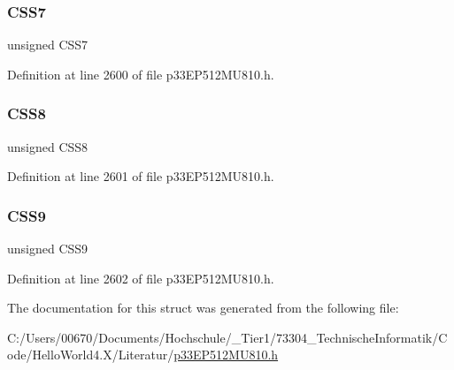 \subsubsection{\texorpdfstring{C\+S\+S7}{CSS7}}
{\footnotesize\ttfamily unsigned C\+S\+S7}



Definition at line 2600 of file p33\+E\+P512\+M\+U810.\+h.

\mbox{\label{structtag_a_d1_c_s_s_l_b_i_t_s_a867408da1e20ee0ab6e6d649393df325}} 
\subsubsection{\texorpdfstring{C\+S\+S8}{CSS8}}
{\footnotesize\ttfamily unsigned C\+S\+S8}



Definition at line 2601 of file p33\+E\+P512\+M\+U810.\+h.

\mbox{\label{structtag_a_d1_c_s_s_l_b_i_t_s_a17176813a1966557c22aa21e3d2df8d8}} 
\subsubsection{\texorpdfstring{C\+S\+S9}{CSS9}}
{\footnotesize\ttfamily unsigned C\+S\+S9}



Definition at line 2602 of file p33\+E\+P512\+M\+U810.\+h.



The documentation for this struct was generated from the following file\+:\begin{DoxyCompactItemize}
\item 
C\+:/\+Users/00670/\+Documents/\+Hochschule/\+\_\+\+Tier1/73304\+\_\+\+Technische\+Informatik/\+Code/\+Hello\+World4.\+X/\+Literatur/\hyperlink{p33_e_p512_m_u810_8h}{p33\+E\+P512\+M\+U810.\+h}\end{DoxyCompactItemize}
